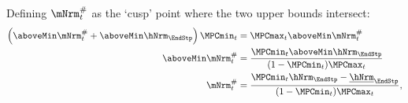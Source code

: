   Defining $\mtCusp$ as the `cusp' point where the two upper bounds
  intersect:
  \begin{equation*}\begin{gathered}\begin{aligned}
        \left(\aboveMin \mtCusp+\aboveMin \hNrm_{\EndStp}\right)\MPCmin_{t}  & =  \MPCmax_{t} \aboveMin \mtCusp \\
        \aboveMin \mtCusp  & =  \frac{\MPCmin_{t}\aboveMin \hNrm_{\EndStp}}{(1-\MPCmin_{t})\MPCmax_{t}} \\
        \mtCusp  & =  \frac{\MPCmin_{t}\hNrm_{\EndStp}-\hEndMin_{\EndStp}}{(1-\MPCmin_{t})\MPCmax_{t}},
      \end{aligned}\end{gathered}\end{equation*}
